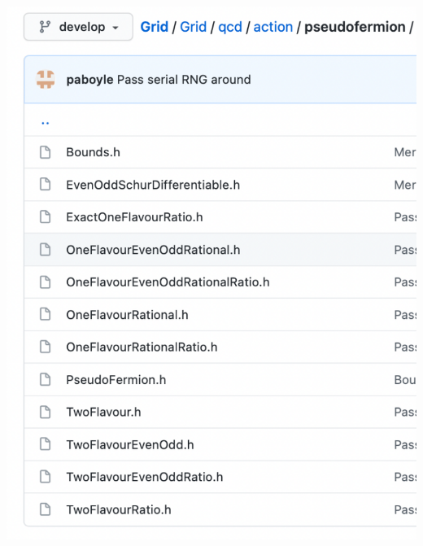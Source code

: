 \documentclass[pdf,ps,8pt]{beamer}
\begin{document}
\begin{frame}[fragile]
\begin{columns}
\begin{column}{0.25\textwidth}
\includegraphics[width=\textwidth]{Pseudofermion.pdf}
\end{column}
\end{columns}
\end{frame}
\end{document}
